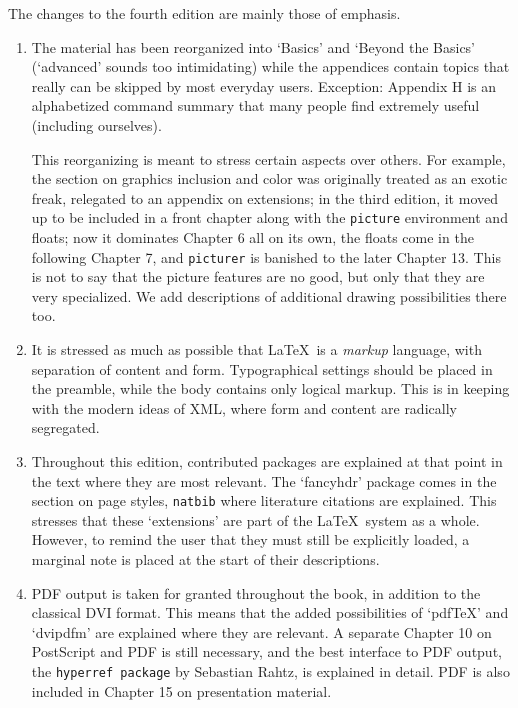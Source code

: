 \documentclass{article}
\begin{document}
The changes to the fourth edition are mainly those of emphasis.
\begin{enumerate}
\item The material has been reorganized into `Basics' and `Beyond the Basics'
  (`advanced' sounds too intimidating) while the appendices contain
  topics that really can be skipped by most everyday users. Exception:
  Appendix H is an alphabetized command summary that many
  people find extremely useful (including ourselves).

  This reorganizing is meant to stress certain aspects over others. For
  example, the section on graphics inclusion and color was originally
  treated as an exotic freak, relegated to an appendix on extensions; in the
  third edition, it moved up to be included in a front chapter along with the
  \texttt{picture} environment and floats; now it dominates
  Chapter 6 all on its own, the floats come in the following
  Chapter 7, and \texttt{picturer} is banished to the later
  Chapter 13. This is not to say that the picture features are no good,
  but only that they are very specialized. We add
  descriptions of additional drawing possibilities there too.

\item It is stressed as much as possible that \LaTeX\ is a \emph{markup}
  language, with separation of content and form. Typographical settings
  should be placed in the preamble, while the body contains only logical
  markup. This is in keeping with the modern ideas of XML, where form and
  content are radically segregated.

\item Throughout this edition, contributed packages are explained at that point
  in the text where they are most relevant. The `fancyhdr' package
  comes in the section on page styles, \texttt{natbib} where literature
  citations are explained. This stresses that these `extensions' are part of
  the \LaTeX\ system as a whole. However, to remind the user that they must
  still be explicitly loaded, a marginal note is placed at the start of their
  descriptions.

\item PDF output is taken for granted throughout the book, in addition to the
  classical DVI format. This means that the added possibilities of `pdf\TeX'
  and `dvipdfm' are explained where they are relevant. A separate
  Chapter 10 on PostScript and PDF is still necessary, and the
  best interface to PDF output, the \texttt{hyperref package} by Sebastian
  Rahtz, is explained in detail. PDF is also included in
  Chapter 15 on presentation material.


\end{enumerate}
\end{document}
